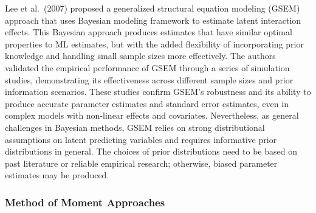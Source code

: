\documentclass[
  man]{apa7}
\begin{document}
Lee et al.~(2007) proposed a generalized structural equation modeling (GSEM) approach that uses Bayesian modeling framework to estimate latent interaction effects. This Bayesian approach produces estimates that have similar optimal properties to ML estimates, but with the added flexibility of incorporating prior knowledge and handling small sample sizes more effectively. The authors validated the empirical performance of GSEM through a series of simulation studies, demonstrating its effectiveness across different sample sizes and prior information scenarios. These studies confirm GSEM's robustness and its ability to produce accurate parameter estimates and standard error estimates, even in complex models with non-linear effects and covariates. Nevertheless, as general challenges in Bayesian methods, GSEM relies on strong distributional assumptions on latent predicting variables and requires informative prior distributions in general. The choices of prior distributions need to be based on past literature or reliable empirical research; otherwise, biased parameter estimates may be produced.

\hypertarget{method-of-moment-approaches}{%
\subsubsection{Method of Moment Approaches}\label{method-of-moment-approaches}}
\end{document}

